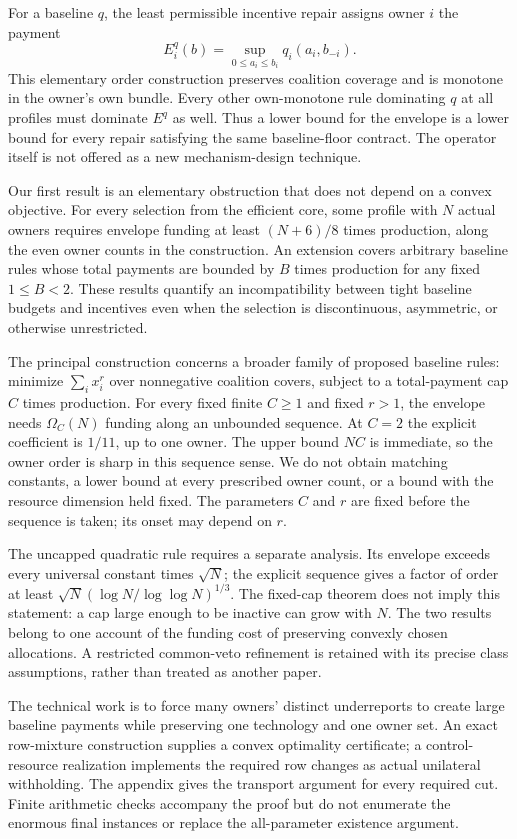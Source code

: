 \documentclass[11pt]{article}
\theoremstyle{definition}
\theoremstyle{remark}
\begin{document}
For a baseline $q$, the least permissible incentive repair assigns owner $i$
the payment
\[
 E_i^q(b)=\sup_{0\leq a_i\leq b_i}q_i(a_i,b_{-i}).
\]
This elementary order construction preserves coalition coverage and is monotone
in the owner's own bundle. Every other own-monotone rule dominating $q$ at all
profiles must dominate $E^q$ as well. Thus a lower bound for the envelope is a
lower bound for every repair satisfying the same baseline-floor contract. The
operator itself is not offered as a new mechanism-design technique.

Our first result is an elementary obstruction that does not depend on a convex
objective. For every selection from the efficient core, some profile with $N$
actual owners requires envelope funding at least $(N+6)/8$ times production,
along the even owner counts in the construction. An extension covers arbitrary
baseline rules whose total payments are bounded by $B$ times production for any
fixed $1\leq B<2$. These results quantify an incompatibility between tight
baseline budgets and incentives even when the selection is discontinuous,
asymmetric, or otherwise unrestricted.

The principal construction concerns a broader family of proposed baseline rules:
minimize $\sum_i x_i^r$ over nonnegative coalition covers, subject to a total-payment
cap $C$ times production. For every fixed finite $C\geq1$ and fixed $r>1$, the
envelope needs $\Omega_C(N)$ funding along an unbounded sequence. At $C=2$ the
explicit coefficient is $1/11$, up to one owner. The upper bound $NC$ is immediate,
so the owner order is sharp in this sequence sense. We do not obtain matching
constants, a lower bound at every prescribed owner count, or a bound with the
resource dimension held fixed. The parameters $C$ and $r$ are fixed before the
sequence is taken; its onset may depend on $r$.

The uncapped quadratic rule requires a separate analysis. Its envelope exceeds
every universal constant times $\sqrt N$; the explicit sequence gives a factor
of order at least $\sqrt N(\log N/\log\log N)^{1/3}$. The fixed-cap theorem does
not imply this statement: a cap large enough to be inactive can grow with $N$.
The two results belong to one account of the funding cost of preserving convexly
chosen allocations. A restricted common-veto refinement is retained with its
precise class assumptions, rather than treated as another paper.

The technical work is to force many owners' distinct underreports to create large
baseline payments while preserving one technology and one owner set. An exact
row-mixture construction supplies a convex optimality certificate; a control-resource
realization implements the required row changes as actual unilateral withholding.
The appendix gives the transport argument for every required cut. Finite arithmetic
checks accompany the proof but do not enumerate the enormous final instances or
replace the all-parameter existence argument.
\end{document}
